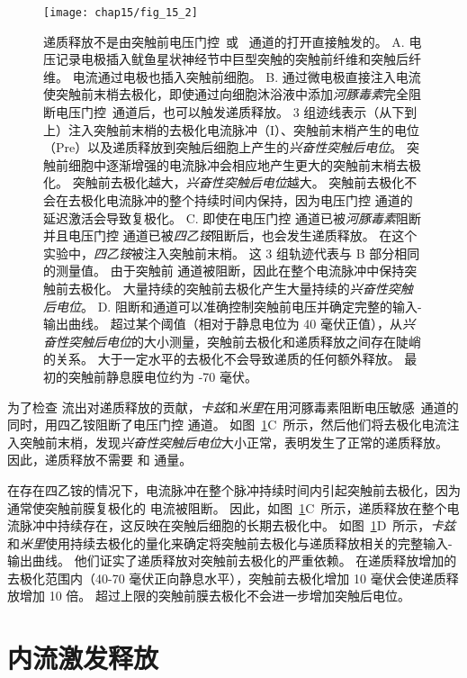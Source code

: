 \begin{figure}[htbp]
	\centering
	\texttt{[image: chap15/fig\_15\_2]}
	\caption{递质释放不是由突触前电压门控~或~ 通道的打开直接触发的\cite{katz1967study}。
	A. 电压记录电极插入鱿鱼星状神经节中巨型突触的突触前纤维和突触后纤维。
	电流通过电极也插入突触前细胞。
	B. 通过微电极直接注入电流使突触前末梢去极化，即使通过向细胞沐浴液中添加\textit{河豚毒素}完全阻断电压门控~通道后，也可以触发递质释放。
	3 组迹线表示（从下到上）注入突触前末梢的去极化电流脉冲（I）、突触前末梢产生的电位（Pre）以及递质释放到突触后细胞上产生的\textit{兴奋性突触后电位}。
	突触前细胞中逐渐增强的电流脉冲会相应地产生更大的突触前末梢去极化。
	突触前去极化越大，\textit{兴奋性突触后电位}越大。
	突触前去极化不会在去极化电流脉冲的整个持续时间内保持，因为电压门控  通道的延迟激活会导致复极化。
	C. 即使在电压门控  通道已被\textit{河豚毒素}阻断并且电压门控  通道已被\textit{四乙铵}阻断后，也会发生递质释放。
	在这个实验中，\textit{四乙铵}被注入突触前末梢。
	这 3 组轨迹代表与 B 部分相同的测量值。
	由于突触前  通道被阻断，因此在整个电流脉冲中保持突触前去极化。
	大量持续的突触前去极化产生大量持续的\textit{兴奋性突触后电位}。
	D. 阻断和通道可以准确控制突触前电压并确定完整的输入-输出曲线。
	超过某个阈值（相对于静息电位为 40 毫伏正值），从\textit{兴奋性突触后电位}的大小测量，突触前去极化和递质释放之间存在陡峭的关系。
	大于一定水平的去极化不会导致递质的任何额外释放。
	最初的突触前静息膜电位约为 -70 毫伏。}
	\label{fig:15_2}
\end{figure}


为了检查  流出对递质释放的贡献，\textit{卡兹}和\textit{米里}在用河豚毒素阻断电压敏感~通道的同时，用四乙铵阻断了电压门控  通道。
如图~\ref{fig:15_2}C~所示，然后他们将去极化电流注入突触前末梢，发现\textit{兴奋性突触后电位}大小正常，表明发生了正常的递质释放。
因此，递质释放不需要  和  通量。


在存在四乙铵的情况下，电流脉冲在整个脉冲持续时间内引起突触前去极化，因为通常使突触前膜复极化的  电流被阻断。
因此，如图~\ref{fig:15_2}C~所示，递质释放在整个电流脉冲中持续存在，这反映在突触后细胞的长期去极化中。
如图~\ref{fig:15_2}D~所示，\textit{卡兹}和\textit{米里}使用持续去极化的量化来确定将突触前去极化与递质释放相关的完整输入-输出曲线。
他们证实了递质释放对突触前去极化的严重依赖。
在递质释放增加的去极化范围内（40-70 毫伏正向静息水平），突触前去极化增加 10 毫伏会使递质释放增加 10 倍。
超过上限的突触前膜去极化不会进一步增加突触后电位。



\section{ 内流激发释放}

